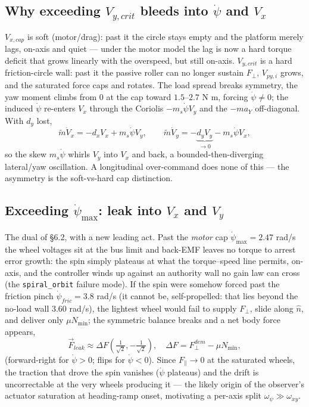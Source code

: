\documentclass[11pt]{article}
\begin{document}
\subsection{Why exceeding $V_{y,crit}$ bleeds into $\dot\psi$ and $V_x$}
$V_{x,cap}$ is soft (motor/drag): past it the circle stays empty and the platform merely lags,
on-axis and quiet --- under the motor model the lag is now a hard torque deficit that grows
linearly with the overspeed, but still on-axis. $V_{y,crit}$ is a hard friction-circle wall: past
it the passive roller can no longer sustain $F_\perp$, $V_{py,i}$ grows, and the saturated force
caps and rotates. The load spread breaks symmetry, the yaw moment climbs from $0$ at the cap
toward $1.5$--$2.7$ N m, forcing $\dot\psi\ne0$; the induced $\dot\psi$ re-enters $V_x$ through
the Coriolis $-m_s\dot\psi V_y$ and the $-ma_Y$ off-diagonal. With $d_y$ lost,
\begin{equation}
\tilde m\dot V_x=-d_xV_x+m_s\dot\psi V_y,\qquad \tilde m\dot V_y=-\underbrace{d_yV_y}_{\to0}-m_s\dot\psi V_x,
\end{equation}
so the skew $m_s\dot\psi$ whirls $V_y$ into $V_x$ and back, a bounded-then-diverging lateral/yaw
oscillation. A longitudinal over-command does none of this --- the asymmetry is the soft-vs-hard cap
distinction.

\subsection{Exceeding $\dot\psi_{\max}$: leak into $V_x$ and $V_y$}
The dual of \S6.2, with a new leading act. Past the \emph{motor} cap $\dot\psi_{\max}=2.47$
rad/s the wheel voltages sit at the bus limit and back-EMF leaves no torque to arrest error
growth: the spin simply plateaus at what the torque--speed line permits, on-axis, and the
controller winds up against an authority wall no gain law can cross (the
\texttt{spiral\_orbit} failure mode). If the spin were somehow forced past the friction pinch
$\dot\psi_{fric}=3.8$ rad/s (it cannot be, self-propelled: that lies beyond the no-load wall
$3.60$ rad/s), the lightest wheel would fail to supply $F_\perp$, slide along
$\hat n$, and deliver only $\mu N_{\min}$; the symmetric balance breaks and a net body force
appears,
\begin{equation}
\vec F_{leak}\approx\Delta F\left(\tfrac{1}{\sqrt2},-\tfrac{1}{\sqrt2}\right),\quad\Delta F=F_\perp^{dem}-\mu N_{\min},
\end{equation}
(forward-right for $\dot\psi>0$; flips for $\dot\psi<0$). Since $F_\parallel\to0$ at the saturated
wheels, the traction that drove the spin vanishes ($\dot\psi$ plateaus) and the drift is
uncorrectable at the very wheels producing it --- the likely origin of the observer's actuator
saturation at heading-ramp onset, motivating a per-axis split $\omega_\psi\gg\omega_{xy}$.
\end{document}
